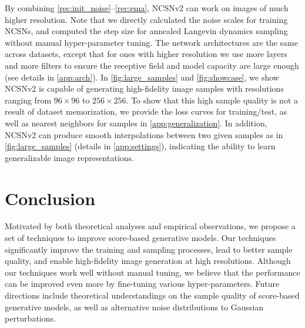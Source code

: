 \documentclass{article}
\begin{document}
By combining \cref{rec:init_noise}--\ref{rec:ema}, NCSNv2 can work on images of much higher resolution. Note that we directly calculated the noise scales for training NCSNs, and computed the step size for annealed Langevin dynamics sampling without manual hyper-parameter tuning. The network architectures are the same across datasets, except that for ones with higher resolution we use more layers and more filters to ensure the receptive field and model capacity are large enough (see details in \cref{app:arch}). In \cref{fig:large_samples} and \ref{fig:showcase}, we show NCSNv2 is capable of generating high-fidelity image samples with resolutions ranging from $96\times 96$ to $256 \times 256$. To show that this high sample quality is not a result of dataset memorization, we provide the loss curves for training/test, as well as nearest neighbors for samples in \cref{app:generalization}. In addition, NCSNv2 can produce smooth interpolations between two given samples as in \cref{fig:large_samples} (details in \cref{app:settings}), indicating the ability to learn generalizable image representations.
 \section{Conclusion}
Motivated by both theoretical analyses and empirical observations, we propose a set of techniques to improve score-based generative models. Our techniques significantly improve the training and sampling processes,
lead to better sample quality, and enable high-fidelity image generation at high resolutions. Although our techniques work well without manual tuning, we believe that the performance can be improved even more by fine-tuning various hyper-parameters. Future directions include theoretical understandings on the sample quality of score-based generative models, as well as alternative noise distributions to Gaussian perturbations.
\end{document}
